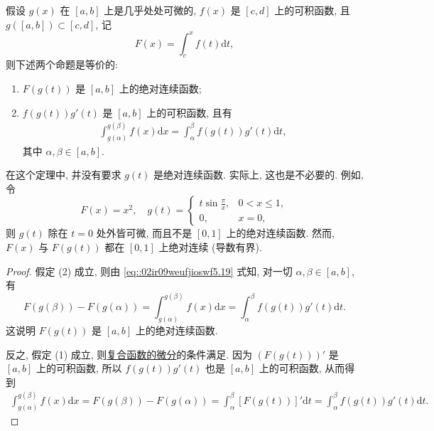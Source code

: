 \documentclass[../../main.tex]{subfiles}%
\begin{document}
\begin{theorem}[换元积分法]\label{theorem:实变函数--换元积分法}
假设 $g(x)$ 在 $[a,b]$ 上是几乎处处可微的, $f(x)$ 是 $[c,d]$ 上的可积函数, 且 $g([a,b])\subset[c,d]$, 记
\[
F(x) = \int_c^x f(t)\mathrm{d}t,
\]
则下述两个命题是等价的:
\begin{enumerate}[(1)]
\item $F(g(t))$ 是 $[a,b]$ 上的绝对连续函数;
\item $f(g(t))g'(t)$ 是 $[a,b]$ 上的可积函数, 且有
\begin{align}
\int_{g(\alpha)}^{g(\beta)} f(x)\mathrm{d}x = \int_{\alpha}^{\beta} f(g(t))g'(t)\mathrm{d}t, \label{eq::02ir09weufjioswf5.19}
\end{align}
其中 $\alpha,\beta\in[a,b]$.
\end{enumerate}
\end{theorem}
\begin{remark}
在这个定理中, 并没有要求 $g(t)$ 是绝对连续函数. 实际上, 这也是不必要的. 例如, 令
\[
F(x) = x^2, \quad g(t) =
\begin{cases}
t\sin\frac{\pi}{x}, & 0<x\leqslant 1, \\
0, & x=0,
\end{cases}
\]
则 $g(t)$ 除在 $t=0$ 处外皆可微, 而且不是 $[0,1]$ 上的绝对连续函数. 然而, $F(x)$ 与 $F(g(t))$ 都在 $[0,1]$ 上绝对连续 (导数有界).
\end{remark}
\begin{proof}

假定 (2) 成立, 则由 \eqref{eq::02ir09weufjioswf5.19} 式知, 对一切 $\alpha,\beta\in[a,b]$, 有
\[
F(g(\beta)) - F(g(\alpha)) = \int_{g(\alpha)}^{g(\beta)} f(x)\mathrm{d}x = \int_{\alpha}^{\beta} f(g(t))g'(t)\mathrm{d}t.
\]
这说明 $F(g(t))$ 是 $[a,b]$ 上的绝对连续函数.

反之, 假定 (1) 成立, 则\hyperref[theorem:实变函数--复合函数的微分]{复合函数的微分}的条件满足. 因为 $(F(g(t)))'$ 是 $[a,b]$ 上的可积函数, 所以 $f(g(t))g'(t)$ 也是 $[a,b]$ 上的可积函数, 从而得到
\begin{align*}
\int_{g(\alpha)}^{g(\beta)} f(x)\mathrm{d}x = F(g(\beta)) - F(g(\alpha)) 
= \int_{\alpha}^{\beta} [F(g(t))]'\mathrm{d}t = \int_{\alpha}^{\beta} f(g(t))g'(t)\mathrm{d}t.
\end{align*}

\end{proof}
\end{document}
